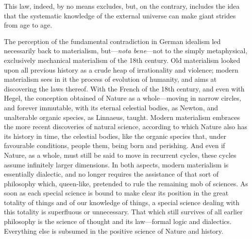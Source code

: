 This law, indeed, by no means excludes, but, on the contrary, includes the idea
that the systematic knowledge of the external universe can make giant strides
from age to age.

The perception of the fundamental contradiction in German idealism led
necessarily back to materialism, but---\emph{nota bene}---not to the simply
metaphysical, exclusively mechanical materialism of the 18th century. Old
materialism looked upon all previous history as a crude heap of irrationality
and violence; modern materialism sees in it the process of evolution of
humanity, and aims at discovering the laws thereof. With the French of the 18th
century, and even with Hegel, the conception obtained of Nature as a
whole---moving in narrow circles, and forever immutable, with its eternal
celestial bodies, as Newton, and unalterable organic species, as Linnaeus,
taught. Modern materialism embraces the more recent discoveries of natural
science, according to which Nature also has its history in time, the celestial
bodies, like the organic species that, under favourable conditions, people them,
being born and perishing. And even if Nature, as a whole, must still be said to
move in recurrent cycles, these cycles assume infinitely larger dimensions. In
both aspects, modern materialism is essentially dialectic, and no longer
requires the assistance of that sort of philosophy which, queen-like, pretended
to rule the remaining mob of sciences. As soon as each special science is bound
to make clear its position in the great totality of things and of our knowledge
of things, a special science dealing with this totality is superfluous or
unnecessary. That which still survives of all earlier philosophy is the science
of thought and its law---formal logic and dialectics. Everything else is
subsumed in the positive science of Nature and history.

